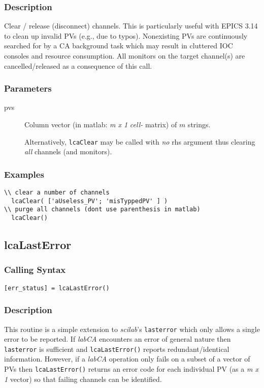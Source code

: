 \documentclass{article}
\newcommand{\sca}{\ita{labCA}}
\newcommand{\scilab}{\ita{scilab}}
\newcommand{\com}[1]{{\tt #1}}
\newcommand{\pbrkf}{\pagebreak}
\newcommand{\ita}[1]{\emph{#1}}
\newcommand{\m}{$m$}
\newcommand{\mhack}{$m$} %
\newcommand{\mxl}{$m\times 1$}
\renewcommand{\m}{\ita{m}}
\newcommand{\mhack}{\ita{m}} %
\renewcommand{\mxl}{\ita{m x 1}}
\renewcommand{\pbrkf}{}
\newcommand{\PVITEM}{
\item[pvs] Column vector (in matlab: \mxl{} \ita{cell-} matrix)
of \mhack{} strings.
}
\begin{document}
\subsubsection{Description}
Clear / release (disconnect) channels. This is particularly useful with
EPICS 3.14 to clean up invalid PVs (e.g., due to typos). Nonexisting PVs are
continuously searched for by a CA background task which may result
in cluttered IOC consoles and resource consumption.
All monitors on the target channel(s) are cancelled/released as a
consequence of this call.
\subsubsection{Parameters}
\begin{description}
\PVITEM
Alternatively, \com{lcaClear} may be called with {\em no} rhs argument
thus clearing {\em all} channels (and monitors).
\end{description}
\subsubsection{Examples}
\begin{verbatim}
\\ clear a number of channels
  lcaClear( ['aUseless_PV'; 'misTyppedPV' ] )
\\ purge all channels (dont use parenthesis in matlab)
  lcaClear()
\end{verbatim}

\vspace*{\fill}
\pbrkf
\subsection{lcaLastError}
\label{lcalasterror}
\subsubsection{Calling Syntax}
\begin{verbatim}
[err_status] = lcaLastError()
\end{verbatim}
\subsubsection{Description}
This routine is a simple extension to \scilab{}'s \com{lasterror}
which only allows a single error to be reported. If \sca{} encounters
an error of general nature then \com{lasterror} is sufficient
and \com{lcaLastError()} reports redundant/identical information.
However, if a \sca{} operation only fails on a subset of a vector
of PVs then \com{lcaLastError()} returns an error code for each individual
PV (as a \mxl{} vector) so that failing channels can be identified.
\end{document}
